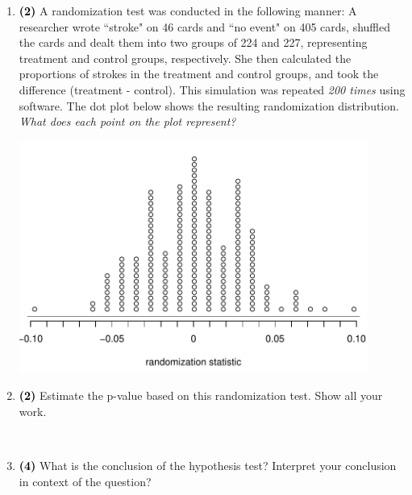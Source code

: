 \documentclass[11pt]{article}
\newcommand{\soln}[1]{ \vspace{1.35cm} }
\newcommand{\pts}[1]{ \textbf{{\footnotesize \textcolor{black}{(#1)}}} }	%
\begin{document}
\begin{enumerate}
\begin{enumerate}
\item \pts{2} A randomization test was conducted in the following manner: A researcher wrote ``stroke" on 46 cards and ``no event" on 405 cards, shuffled the cards and dealt them into two groups of 224 and 227, representing treatment and control groups, respectively. She then calculated the proportions of strokes in the treatment and control groups, and took the difference (treatment - control). This simulation was repeated \emph{200 times} using software. The dot plot below shows the resulting randomization distribution. \emph{What does each point on the plot represent?} \\
\begin{minipage}[c]{0.5\textwidth}
\includegraphics[width=0.9\textwidth]{figures/stroke/stroke}
\end{minipage}
\begin{minipage}[c]{0.3\textwidth}
\soln{Each dot represents a simulated difference between the proportions of strokes between the treatment and control groups}
\end{minipage}

\vfill

\pagebreak

%

\item \pts{2} Estimate the p-value based on this randomization test. Show all your work.

\soln{Proportion of simulations with $|\hat{p}_{sim,T} - \hat{p}_{sim,C}| \ge 0.09 = 2 / 200 = 0.01$}
$\:$ \\

\item \pts{4} What is the conclusion of the hypothesis test? Interpret your conclusion in context of the question?


\end{enumerate}
\end{enumerate}
\end{document}

